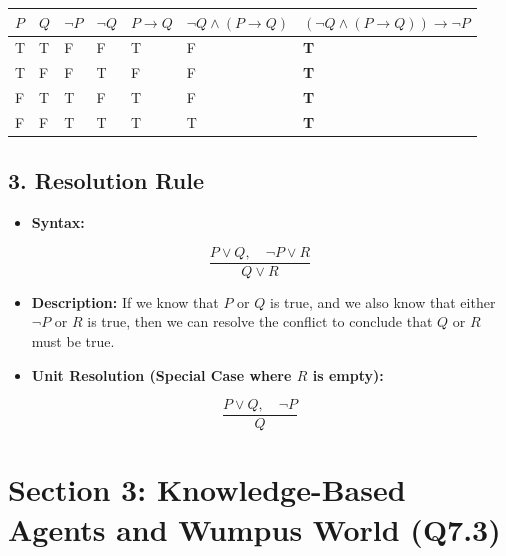 \begin{table}[H]
\centering
\begin{tabular}{|p{}|p{}|p{}|p{}|p{}|p{}|p{}|}
\hline
$P$ & $Q$ & $\neg P$ & $\neg Q$ & $P \rightarrow Q$ & $\neg Q \land (P \rightarrow Q)$ & $(\neg Q \land (P \rightarrow Q)) \rightarrow \neg P$ \\
\hline
T & T & F & F & T & F & \textbf{T} \\
\hline
T & F & F & T & F & F & \textbf{T} \\
\hline
F & T & T & F & T & F & \textbf{T} \\
\hline
F & F & T & T & T & T & \textbf{T} \\
\hline
\end{tabular}
\end{table}


\subsection{3. Resolution Rule}
\begin{itemize}
  \item   \textbf{Syntax:}
\end{itemize}
    \[ \frac{P \lor Q, \quad \neg P \lor R}{Q \lor R} \]
\begin{itemize}
  \item   \textbf{Description:} If we know that $P$ or $Q$ is true, and we also know that either $\neg P$ or $R$ is true, then we can resolve the conflict to conclude that $Q$ or $R$ must be true.
  \item   \textbf{Unit Resolution (Special Case where $R$ is empty):}
\end{itemize}
    \[ \frac{P \lor Q, \quad \neg P}{Q} \]


\section{Section 3: Knowledge-Based Agents and Wumpus World (Q7.3)}

